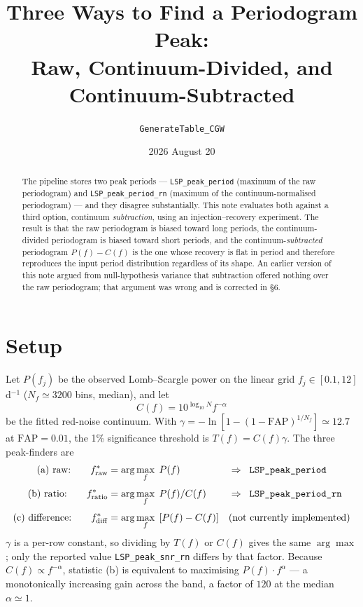 \documentclass[11pt]{article}
\title{Three Ways to Find a Periodogram Peak:\\
       Raw, Continuum-Divided, and Continuum-Subtracted}
\author{\texttt{GenerateTable\_CGW}}
\date{2026 August 20}
\newcommand{\Praw}{\texttt{LSP\_peak\_period}}
\newcommand{\Prn}{\texttt{LSP\_peak\_period\_rn}}
\newcommand{\Srn}{\texttt{LSP\_peak\_snr\_rn}}
\begin{document}
\maketitle

\begin{abstract}
The pipeline stores two peak periods --- \Praw{} (maximum of the raw periodogram) and
\Prn{} (maximum of the continuum-normalised periodogram) --- and they disagree
substantially. This note evaluates both against a third option, continuum
\emph{subtraction}, using an injection--recovery experiment. The result is that the raw
periodogram is biased toward long periods, the continuum-divided periodogram is biased
toward short periods, and the continuum-\emph{subtracted} periodogram
$P(f)-C(f)$ is the one whose recovery is flat in period and therefore reproduces the
input period distribution regardless of its shape. An earlier version of this note argued
from null-hypothesis variance that subtraction offered nothing over the raw
periodogram; that argument was wrong and is corrected in \S6.
\end{abstract}

\section{Setup}

Let $P(f_j)$ be the observed Lomb--Scargle power on the linear grid
$f_j \in [0.1, 12]$ d$^{-1}$ ($N_f \simeq 3200$ bins, median), and let
%
\begin{equation}
  C(f) = 10^{\log_{10}N} f^{-\alpha}
  \label{eq:continuum}
\end{equation}
%
be the fitted red-noise continuum. With
$\gamma = -\ln[1-(1-\mathrm{FAP})^{1/N_f}] \simeq 12.7$ at $\mathrm{FAP}=0.01$, the 1\%
significance threshold is $T(f) = C(f)\gamma$. The three peak-finders are
%
\begin{align}
  \text{(a) raw:}\qquad
    f^{\ast}_{\rm raw}   &= \arg\max_f \; P(f)
    &&\Rightarrow\;\; \Praw
    \label{eq:fraw}\\[3pt]
  \text{(b) ratio:}\qquad
    f^{\ast}_{\rm ratio} &= \arg\max_f \; P(f)/C(f)
    &&\Rightarrow\;\; \Prn
    \label{eq:fratio}\\[3pt]
  \text{(c) difference:}\qquad
    f^{\ast}_{\rm diff}  &= \arg\max_f \; \left[P(f) - C(f)\right]
    &&\text{(not currently implemented)}
    \label{eq:fdiff}
\end{align}
%
$\gamma$ is a per-row constant, so dividing by $T(f)$ or $C(f)$ gives the same
$\arg\max$; only the reported value \Srn{} differs by that factor. Because
$C(f)\propto f^{-\alpha}$, statistic (b) is equivalent to maximising
$P(f)\cdot f^{\alpha}$ --- a monotonically increasing gain across the band, a factor of
$120$ at the median $\alpha \simeq 1$.
\end{document}
